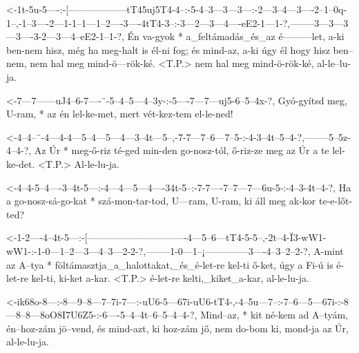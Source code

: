   {<-1t-5u-5----:-[------------------tT45uj5T4-4--:-5-4--3---3---3---:-2---3--4---3----2--1--0q-1--,-1--3----2---1-1--1---1--2----3----4tT4-3--:-3---2---3---4----eE2-1---1-?,--------3---3---3---3----3-2---3---4--eE2-1--1-?,}
  {  Én va-gyok * a_feltámadás_és_az é---------let, a-ki ben-nem hisz, még ha meg-halt is él-ni fog; és mind-az, a-ki úgy él hogy hisz ben--nem, nem hal meg mind-ö---rök-ké.  <T.P.> nem hal meg mind-ö-rök-ké, al-le--lu-ja.}


  {<-7---7------uJ4--6-7----¨-5--4--5---4--3y-:-5----7---7---uj5-6--5--4x-?,}
  {  Gyó-gyítsd meg, U-ram, * az én lel-ke-met, mert vét-kez-tem el-le-ned!}


  {<-4--4--¨-4---4-4---5--4---5---4---3--4t---5--,-7-7---7--6---7--5-:-4-3--4t--5--4-?,--------5--5z-4--4-?,}
  {  Az Úr * meg-ő-riz té-ged min-den go-nosz-tól, ő-riz-ze meg az Úr  a te lel-ke-det. <T.P.> Al-le-lu-ja.}

  {<-4--4-5--4----3--4t-5---:-4---4---5---4----34t-5--:-7-7----7--7---7---6u-5-:-4--3-4t--4-?,}
  {  Ha a go-nosz-sá-go-kat * szá-mon-tar-tod, U---ram, U-ram, ki áll meg ak-kor te-e-lőt-ted?}

  {<-1-2----4--4t-5---:-[-------------------------------4---5--6---tT4-5-5--,-2t--4-Ï3-wW1-wW1-:-1-0---1--2---3---4--3---2-2-?,--------1-0---1--¡--------------3----4--3--2--2-?,}
  {  A-mint az A--tya * föltámasztja_a_halottakat,_és_é-let-re kel-ti  ő-ket, úgy a Fi-ú   is    é-let-re kel-ti, ki-ket a-kar. <T.P.> é-let-re kelti,_kiket_a-kar, al-le-lu-ja.}

  {<-ik68o-8---:-8---9--8---7--7i-7---:-uU6-5---67i-uU6-tT4-,-4--5u---7--:-7--6---5---67i-:-8---8--8---8oO8I7U6Z5-:-6----5--4--4t--6--5--4--4-?,}
  {  Mind--az, * kit né-kem ad A--tyám, én--hoz-zám jö--vend, és mind-azt, ki hoz-zám jő,   nem do-bom ki,          mond-ja az Úr, al-le-lu-ja.}
